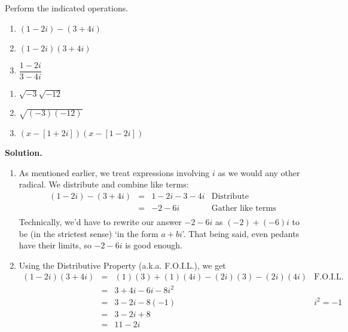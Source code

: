 \documentclass{ximera}
\begin{document}
\begin{ex} \label{complexzeroex1} Perform the indicated operations.
\label{complexnumberarithmetic}

\begin{multicols}{3}
\begin{enumerate}

\item  $(1-2i) - (3+4i)$ 
\item  $(1-2i)(3+4i)$ 
\item  $\dfrac{1-2i}{3-4i}$

\setcounter{HW}{\value{enumi}}
\end{enumerate}
\end{multicols}

\begin{multicols}{3}
\begin{enumerate}
\setcounter{enumi}{\value{HW}}

\item  $\sqrt{-3} \sqrt{-12}$
\item  $\sqrt{(-3)(-12)}$
\item  $(x-[1+2i])(x-[1-2i])$

\setcounter{HW}{\value{enumi}}
\end{enumerate}
\end{multicols}

{\bf Solution.} 

\begin{enumerate}

\item  As mentioned earlier, we treat expressions involving $i$ as we would any other radical. We distribute and combine like terms:\[ \begin{array}{rclr}

 (1-2i) - (3+4i) & = &  1-2i-3-4i & \text{Distribute} \\
                 & = &  -2 - 6i & \text{Gather like terms} \\
\end{array}\] Technically, we'd have to rewrite our answer  $-2-6i$ as $(-2) + (-6)i$ to be (in the strictest sense) `in the form $a+bi$'. That being said, even pedants have their limits, so $-2-6i$ is good enough.

\item  Using the Distributive Property (a.k.a. F.O.I.L.), we get \[ \begin{array}{rclr}

  (1-2i)(3+4i)  & = & (1)(3) + (1)(4i) - (2i)(3) - (2i)(4i) & \text{F.O.I.L.} \\
	              & = & 3+4i-6i-8i^2 & \\
								& = & 3 - 2i - 8(-1) & \text{$i^2=-1$} \\
								& = & 3 - 2i + 8 & \\
								& = & 11 - 2i & \\ \end{array}\]


\end{enumerate}
\end{ex}
\end{document}
